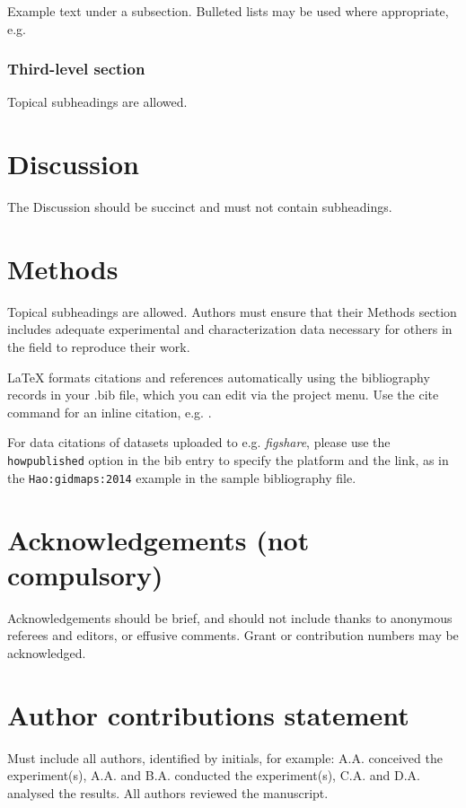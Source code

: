 \documentclass[fleqn,10pt]{wlscirep}
\begin{document}
Example text under a subsection. Bulleted lists may be used where appropriate, e.g.


\subsubsection*{Third-level section}
 
Topical subheadings are allowed.

\section*{Discussion}

The Discussion should be succinct and must not contain subheadings.

\section*{Methods}

Topical subheadings are allowed. Authors must ensure that their Methods section includes adequate experimental and characterization data necessary for others in the field to reproduce their work.



\noindent LaTeX formats citations and references automatically using the bibliography records in your .bib file, which you can edit via the project menu. Use the cite command for an inline citation, e.g.  \cite{Hao:gidmaps:2014}.

For data citations of datasets uploaded to e.g. \emph{figshare}, please use the \verb|howpublished| option in the bib entry to specify the platform and the link, as in the \verb|Hao:gidmaps:2014| example in the sample bibliography file.

\section*{Acknowledgements (not compulsory)}

Acknowledgements should be brief, and should not include thanks to anonymous referees and editors, or effusive comments. Grant or contribution numbers may be acknowledged.

\section*{Author contributions statement}

Must include all authors, identified by initials, for example:
A.A. conceived the experiment(s),  A.A. and B.A. conducted the experiment(s), C.A. and D.A. analysed the results.  All authors reviewed the manuscript. 
\end{document}
